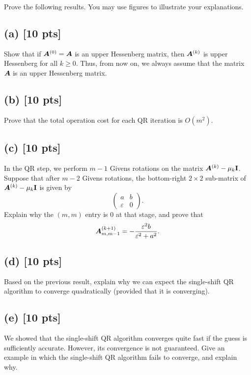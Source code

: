 \documentclass[twoside,10pt]{article}
\begin{document}
  Prove the following results.
  You may use figures to illustrate your explanations. 
  \subsection*{(a) [10 pts]}
  Show that if $\bm{A}^{(0)} = \bm{A}$ is an upper Hessenberg matrix, then $\bm{A}^{(k)}$ is upper Hessenberg for all $k \geq 0$.
  Thus, from now on, we always assume that the matrix $\bm{A}$ is an upper Hessenberg matrix.

  \subsection*{(b) [10 pts]}
  Prove that the total operation cost for each QR iteration is $O(m^2)$.

  \subsection*{(c) [10 pts]}
  In the QR step, we perform $m - 1$ Givens rotations on the matrix $\bm{A}^{(k)} - \mu_k \mathbf{I}$. 
  Suppose that after $m - 2$ Givens rotations, the bottom-right $2 \times 2$ sub-matrix of $\bm{A}^{(k)} - \mu_k \mathbf{I}$ is given by
  \begin{equation}
    \begin{pmatrix}
      a & b \\
      \varepsilon & 0
    \end{pmatrix}.
  \end{equation}
  Explain why the $(m, m)$ entry is $0$ at that stage, and prove that 
  \begin{equation}
    \bm{A}_{m, m-1}^{(k + 1)} = - \frac{\varepsilon^2 b}{\varepsilon^2 + a^2}.
  \end{equation}

  \subsection*{(d) [10 pts]} 
  Based on the previous result, explain why we can expect the single-shift QR algorithm to converge quadratically (provided that it is converging). 

  \subsection*{(e) [10 pts]}
  We showed that the single-shift QR algorithm converges quite fast if the guess is sufficiently accurate. 
  However, its convergence is not guaranteed.
  Give an example in which the single-shift QR algorithm fails to converge, and explain why.
\end{document}
